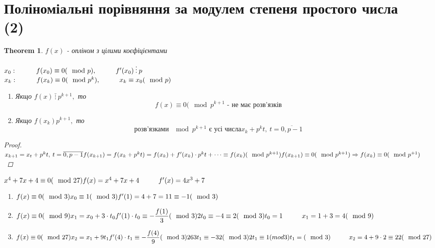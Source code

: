\documentclass[a4paper,12pt, centered]{bookest}
\newtheorem{theorem}{Theorem}[section]
\newcommand\tab[1][1cm]{\hspace*{#1}}
\begin{document}
\section{Поліноміальні порівняння за модулем степеня простого числа (2)}
\begin{theorem}
	$f(x)$ - опліном з цілими коєфіцієнтами 
	\begin{center}
		$x_0:\tab f(x_0)\equiv0(\mod p),\tab f'(x_0)\>\vdots\>p$\\$x_k:\tab f(x_k)\equiv0(\mod p^k),\tab x_k\equiv x_0(\mod p)$\\
		\begin{enumerate}
			\item Якщо $f(x)\>\bar{\vdots}\>p^{k+1},$ то $$f(x)\equiv0(\mod p^{k+1}\textrm{ - не має розв'язків}$$
			\item Якщо $f(x_k)p^{k+1},$ то 
			$$\textrm{розв'язками } \mod p^{k+1}\textrm{ є усі числа}x_k+p^kt,\>t=\overline{0,p-1}$$
		\end{enumerate}
	\end{center}
	\begin{proof}
		$\\x_{k+1}=x_t+p^kt,\>t=\overline{0,p-1}\\f(x_{k+1})=f(x_k+p^kt)=f(x_k)+f'(x_k)\cdot p^kt+\dots\equiv f(x_k)(\mod p^{k+1})\\f(x_{k+1})\equiv 0(\mod p^{k+1})\Rightarrow f(x_k)\equiv0(\mod p^{+1})$
	\end{proof}
\end{theorem}
\begin{example}
	$x^4+7x+4\equiv0(\mod 27)\\f(x)=x^4+7x+4\tab f'(x)=4x^3+7$\begin{enumerate}
		\item $f(x)\equiv0(\mod 3)\\x_0\equiv 1(\mod 3)\\f'(1)=4+7=11\equiv-1(\mod 3)$
		\item $f(x)\equiv0(\mod 9)\\x_1=x_0+3\cdot t_0\\f'(1)\cdot t_0\equiv-\dfrac{f(1)}{3}(\mod 3)\\2t_0\equiv-4\equiv 2(\mod 3)\\t_0=1\tab x_1=1+3=4(\mod 9)$
		\item $f(x)\equiv0(\mod 27)\\x_2=x_1+9t_1\\f'(4)\cdot t_1\equiv -\dfrac{f(4)}{9}(\mod 3)\\263t_1\equiv-32(\mod 3)\\2t_1\equiv 1(mod 3)\\t_1=(\mod 3)\tab x_2=4+9\cdot2\equiv 22(\mod 27)$
	\end{enumerate}
\end{example}
\end{document}
